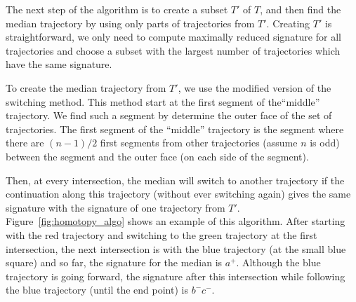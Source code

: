 The next step of the algorithm is to create a subset $T'$ of $T$, and then find the median trajectory by using only parts of trajectories from $T'$.
Creating $T'$ is straightforward, we only need to compute maximally reduced signature for all trajectories and choose a subset with the largest number of trajectories which have the same signature.

To create the median trajectory from $T'$, we use the modified version of the switching method.
This method start at the first segment of the``middle'' trajectory.
We find such a segment by determine the outer face of the set of trajectories.
The first segment of the ``middle'' trajectory is the segment where there are $(n-1)/2$ first segments from other trajectories (assume $n$ is odd) between the segment and the outer face (on each side of the segment).


Then, at every intersection, the median will switch to another trajectory if the continuation along this trajectory (without ever switching again) gives the same signature with the signature of one trajectory from $T'$.
Figure~\ref{fig:homotopy_algo} shows an example of this algorithm.
After starting with the red trajectory and switching to the green trajectory at the first intersection, the next intersection is with the blue trajectory (at the small blue square) and so far, the signature for the median is \textit{$a^{+}$}. 
Although the blue trajectory is going forward, the signature after this intersection while following the blue trajectory (until the end point) is \textit{$b^{-}c^{-}$}. 

